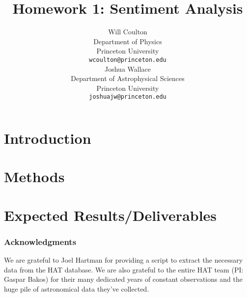 \documentclass{article} %
\title{Homework 1: Sentiment Analysis}
\author{
Will Coulton \\
Department of Physics \\
Princeton University\\
\texttt{wcoulton@princeton.edu} \\
\And
Joshua Wallace\\
Department of Astrophysical Sciences\\
Princeton University\\
\texttt{joshuajw@princeton.edu} \\
}
\begin{document}
\maketitle

\begin{abstract}

\end{abstract}

\section{Introduction}





\section{Methods}


\section{Expected Results/Deliverables}


\subsubsection*{Acknowledgments}
We are grateful to Joel Hartman for providing a script to extract the
necessary data from the HAT database.  We are also grateful to the
entire HAT team (PI: Gaspar Bakos) for their many dedicated years of
constant observations and the huge pile of astronomical data they've collected.




\end{document}

